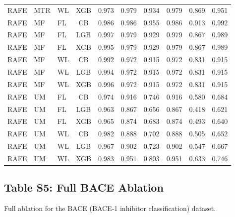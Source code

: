 \documentclass[9pt,a4paper]{article}
\begin{document}
\begin{scriptsize}
\begin{longtable}{lllcrrrrrr}
RAFE & MTR & WL & XGB & 0.973 & 0.979 & 0.934 & 0.979 & 0.869 & 0.951 \\
RAFE & MF  & FL & CB  & 0.986 & 0.986 & 0.955 & 0.986 & 0.913 & 0.992 \\
RAFE & MF  & FL & LGB & 0.997 & 0.979 & 0.929 & 0.979 & 0.867 & 0.989 \\
RAFE & MF  & FL & XGB & 0.995 & 0.979 & 0.929 & 0.979 & 0.867 & 0.989 \\
RAFE & MF  & WL & CB  & 0.992 & 0.972 & 0.915 & 0.972 & 0.831 & 0.915 \\
RAFE & MF  & WL & LGB & 0.994 & 0.972 & 0.915 & 0.972 & 0.831 & 0.915 \\
RAFE & MF  & WL & XGB & 0.996 & 0.972 & 0.915 & 0.972 & 0.831 & 0.915 \\
RAFE & UM  & FL & CB  & 0.974 & 0.916 & 0.746 & 0.916 & 0.580 & 0.684 \\
RAFE & UM  & FL & LGB & 0.963 & 0.867 & 0.656 & 0.867 & 0.418 & 0.621 \\
RAFE & UM  & FL & XGB & 0.965 & 0.874 & 0.683 & 0.874 & 0.493 & 0.640 \\
RAFE & UM  & WL & CB  & 0.982 & 0.888 & 0.702 & 0.888 & 0.505 & 0.652 \\
RAFE & UM  & WL & LGB & 0.967 & 0.902 & 0.723 & 0.902 & 0.547 & 0.667 \\
RAFE & UM  & WL & XGB & 0.983 & 0.951 & 0.803 & 0.951 & 0.633 & 0.746 \\
\end{longtable}
\end{scriptsize}

\newpage

\subsection*{Table S5: Full BACE Ablation}

Full ablation for the BACE (BACE-1 inhibitor classification) dataset.
\end{document}
